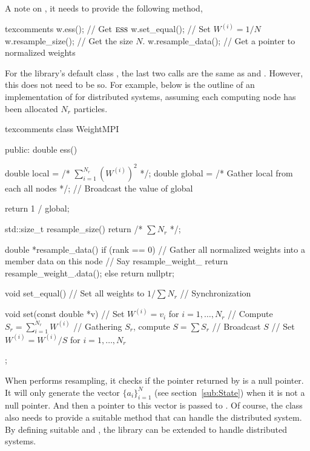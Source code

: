 A note on , it needs to provide the following method,
\begin{cppcode*}{texcomments}
  w.ess();           // Get $\text{\normalfont\textsc{ess}}$
  w.set_equal();     // Set $W^{(i)} = 1/N$
  w.resample_size(); // Get the size $N$.
  w.resample_data(); // Get a pointer to normalized weights
\end{cppcode*}
For the library's default class , the last two calls are the
same as  and . However, this does not
need to be so. For example, below is the outline of an implementation of
 for distributed systems, assuming each computing node
has been allocated $N_r$ particles.
\begin{cppcode*}{texcomments}
  class WeightMPI
  {
      public:
      double ess()
      {
          double local = /* $\sum_{i=1}^{N_r}(W^{(i)})^2$ */;
          double global = /* Gather local from each all nodes */;
          // Broadcast the value of global

          return 1 / global;
      }

      std::size_t resample_size() { return /* $\sum N_r$ */; }

      double *resample_data()
      {
          if (rank == 0) {
              // Gather all normalized weights into a member data on this node
              // Say resample\_weight\_
              return resample_weight_.data();
          } else {
              return nullptr;
          }
      }

      void set_equal()
      {
          // Set all weights to $1 / \sum N_r$
          // Synchronization
      }

      void set(const double *v)
      {
          // Set $W^{(i)} = v_i$ for $i = 1,\dots,N_r$
          // Compute $S_r = \sum_{i=1}^{N_r} W^{(i)}$
          // Gathering $S_r$, compute $S = \sum S_r$
          // Broadcast $S$
          // Set $W^{(i)} = W^{(i)} / S$ for $i = 1,\dots,N_r$
      }
  };
\end{cppcode*}
When  performs resampling, it checks if the pointer
returned by  is a null pointer. It will only
generate the vector $\{a_i\}_{i=1}^N$ (see section~\ref{sub:State}) when it is
not a null pointer. And then a pointer to this vector is passed to
. Of course, the class  also needs to provide a
suitable method  that can handle the distributed system. By
defining suitable  and , the library
can be extended to handle distributed systems.


